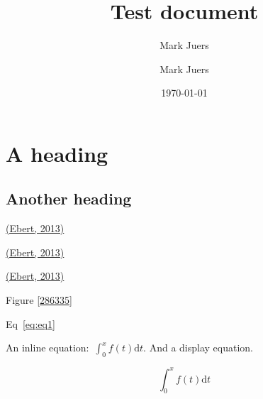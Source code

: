 \documentclass[10pt]{article}
\author[1]{Mark Juers}
\affil[1]{Indiana University}
\begin{document}
\title{Test document}



\author[1]{Mark Juers}%
%


\vspace{-1em}



  \date{\today}


\begingroup
\let\center\flushleft
\let\endcenter\endflushleft
\maketitle
\endgroup









\section*{A heading}

{\label{850151}}

\subsection*{Another heading}

{\label{367935}}

\hyperref[csl:1]{(Ebert, 2013)}

\hyperref[csl:1]{(Ebert, 2013)}

\hyperref[csl:1]{(Ebert, 2013)}

Figure {\ref{286335}}

Eq~{\ref{eq:eq1}}

An inline equation:~\(\int_0^xf\left(t\right)\mathrm{d}t\). And a display equation.

\begin{equation}
\label{eq:eq1}
\int_0^x f(t) \mathrm{d}t
\end{equation}
\end{document}
